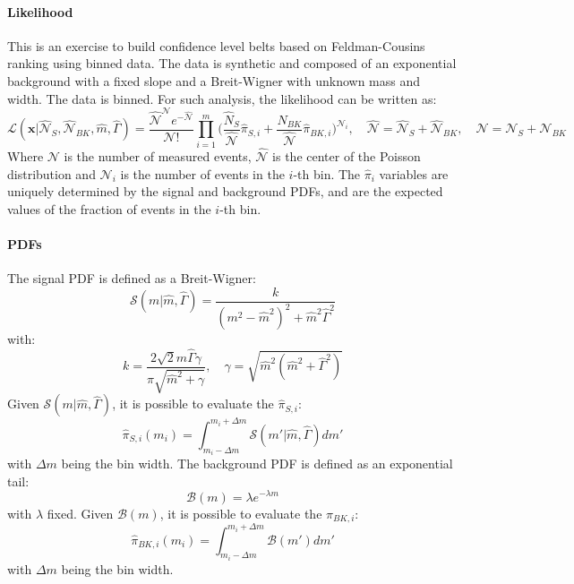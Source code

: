 \begin{refsection}
        \paragraph{Likelihood}
        This is an exercise to build confidence level belts based on Feldman-Cousins ranking using binned data.
        The data is synthetic and composed of an exponential background with a fixed slope and a Breit-Wigner with unknown mass and width. The data is binned.
        For such analysis, the likelihood can be written as:
        \begin{equation}
            \mathcal{L}(\textbf{x}|\hat{\mathcal{N}}_{S}, \hat{\mathcal{N}}_{BK}, \hat{m}, \hat{\Gamma}) = \frac{\hat{\mathcal{N}}^\mathcal{N} e^{-\hat{\mathcal{N}}} }{\mathcal{N}!} \prod_{i=1}^{m} \Big( \frac{\hat{N}_S}{\hat{\mathcal{N}}} \hat{\pi}_{S, i} + \frac{\hat{N}_{BK}}{\hat{\mathcal{N}}} \hat{\pi}_{BK, i} \Big)^{\mathcal{N}_i}, \quad \hat{\mathcal{N}} = \hat{\mathcal{N}}_{S} + \hat{\mathcal{N}}_{BK}, \quad \mathcal{N} = \mathcal{N}_{S} + \mathcal{N}_{BK}
        \end{equation}
        Where $\mathcal{N}$ is the number of measured events, $\hat{\mathcal{N}}$ is the center of the Poisson distribution and $\mathcal{N}_i$ is the number of events in the $i$-th bin.
        The $\hat{\pi}_i$ variables are uniquely determined by the signal and background PDFs, and are the expected values of the fraction of events in the $i$-th bin.

        \paragraph{PDFs}
        The signal PDF is defined as a Breit-Wigner:
        \begin{equation}
	   \mathcal{S}(m | \hat{m}, \hat{\Gamma}) = \frac{k}{(m^2 - \hat{m}^2)^2 + \hat{m}^2\hat{\Gamma}^2}
        \end{equation}
        with:
        \begin{equation}
	   k = \frac{2\sqrt{2}\hat{m}\hat{\Gamma}\gamma}{\pi\sqrt{\hat{m}^2 + \gamma}}, \quad \gamma = \sqrt{\hat{m}^2 ( \hat{m}^2 + \hat{\Gamma}^2)}
        \end{equation}
        Given $\mathcal{S}(m | \hat{m}, \hat{\Gamma})$, it is possible to evaluate the $\hat{\pi}_{S,i}$:
        \begin{equation}
	   \hat{\pi}_{S,i} (m_i) = \int_{m_i - \Delta m}^{m_i + \Delta m} \mathcal{S}(m\prime | \hat{m}, \hat{\Gamma}) dm\prime
        \end{equation}
        with $\Delta m$ being the bin width.
        The background PDF is defined as an exponential tail:
        \begin{equation}
	   \mathcal{B}(m) = \lambda e^{-\lambda m}
        \end{equation}
        with $\lambda$ fixed.
        Given $\mathcal{B}(m)$, it is possible to evaluate the $\hat{\pi}_{BK,i}$:
        \begin{equation}
	   \hat{\pi}_{BK,i} (m_i) = \int_{m_i - \Delta m}^{m_i + \Delta m} \mathcal{B}(m\prime)  dm\prime
        \end{equation}
        with $\Delta m$ being the bin width.


\end{refsection}

